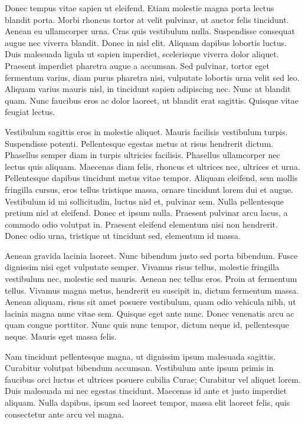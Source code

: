 Donec tempus vitae sapien ut eleifend. Etiam molestie magna porta lectus blandit porta. Morbi rhoncus tortor at velit pulvinar, ut auctor felis tincidunt. Aenean eu ullamcorper urna. Cras quis vestibulum nulla. Suspendisse consequat augue nec viverra blandit. Donec in nisl elit. Aliquam dapibus lobortis luctus. Duis malesuada ligula ut sapien imperdiet, scelerisque viverra dolor aliquet. Praesent imperdiet pharetra augue a accumsan. Sed pulvinar, tortor eget fermentum varius, diam purus pharetra nisi, vulputate lobortis urna velit sed leo. Aliquam varius mauris nisl, in tincidunt sapien adipiscing nec. Nunc at blandit quam. Nunc faucibus eros ac dolor laoreet, ut blandit erat sagittis. Quisque vitae feugiat lectus.

Vestibulum sagittis eros in molestie aliquet. Mauris facilisis vestibulum turpis. Suspendisse potenti. Pellentesque egestas metus at risus hendrerit dictum. Phasellus semper diam in turpis ultricies facilisis. Phasellus ullamcorper nec lectus quis aliquam. Maecenas diam felis, rhoncus et ultrices nec, ultrices et urna. Pellentesque dapibus tincidunt metus vitae tempor. Aliquam eleifend, sem mollis fringilla cursus, eros tellus tristique massa, ornare tincidunt lorem dui et augue. Vestibulum id mi sollicitudin, luctus nisl et, pulvinar sem. Nulla pellentesque pretium nisl at eleifend. Donec et ipsum nulla. Praesent pulvinar arcu lacus, a commodo odio volutpat in. Praesent eleifend elementum nisi non hendrerit. Donec odio urna, tristique ut tincidunt sed, elementum id massa.

Aenean gravida lacinia laoreet. Nunc bibendum justo sed porta bibendum. Fusce dignissim nisi eget vulputate semper. Vivamus risus tellus, molestie fringilla vestibulum nec, molestie sed mauris. Aenean nec tellus eros. Proin at fermentum tellus. Vivamus magna metus, hendrerit eu suscipit in, dictum fermentum massa. Aenean aliquam, risus sit amet posuere vestibulum, quam odio vehicula nibh, ut lacinia magna nunc vitae sem. Quisque eget ante nunc. Donec venenatis arcu ac quam congue porttitor. Nunc quis nunc tempor, dictum neque id, pellentesque neque. Mauris eget massa felis.

Nam tincidunt pellentesque magna, ut dignissim ipsum malesuada sagittis. Curabitur volutpat bibendum accumsan. Vestibulum ante ipsum primis in faucibus orci luctus et ultrices posuere cubilia Curae; Curabitur vel aliquet lorem. Duis malesuada mi nec egestas tincidunt. Maecenas id ante et justo imperdiet aliquam. Nulla dapibus, ipsum sed laoreet tempor, massa elit laoreet felis, quis consectetur ante arcu vel magna.

